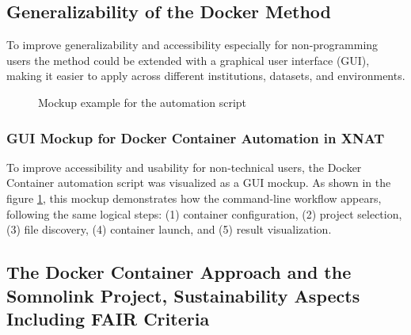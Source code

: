 \subsection{Generalizability of the Docker Method}

To improve generalizability and accessibility especially for non-programming users the method could be extended with a graphical user interface (GUI), making it easier to apply across different institutions, datasets, and environments. 

\begin{figure}[H]
    \centering
    \def\svgwidth{\linewidth} 
    
    \caption{Mockup example for the automation script}
    \label{fig:mockup}
\end{figure}
\normalsize
\subsubsection{GUI Mockup for Docker Container Automation in XNAT}

To improve accessibility and usability for non-technical users, the Docker Container  automation script was visualized as a GUI mockup. As shown in the figure \ref{fig:mockup}, this mockup demonstrates how the command-line workflow appears, following the same logical steps: (1) container configuration, (2) project selection, (3) file discovery, (4) container launch, and (5) result visualization.

\subsection{The Docker Container Approach and the Somnolink Project, Sustainability Aspects Including FAIR Criteria}

